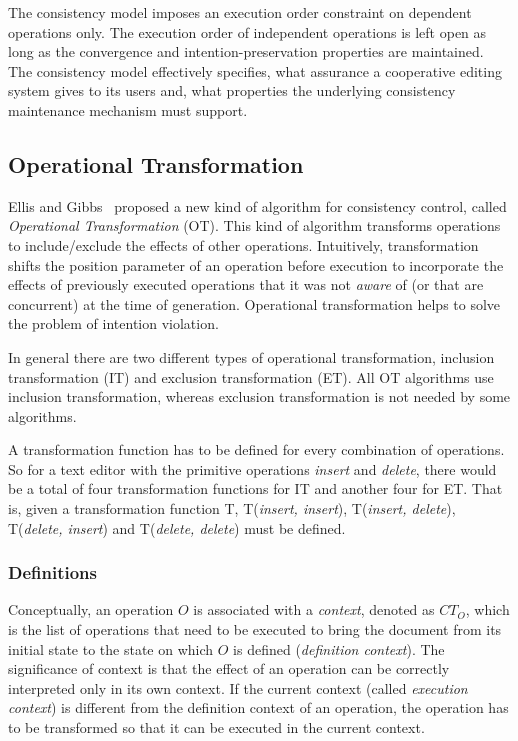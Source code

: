\documentclass[11pt,a4paper]{article}
\begin{document}
The consistency model imposes an execution order constraint on dependent operations only. The execution order of independent operations is left open as long as the convergence and intention-preservation properties are maintained. The consistency model effectively specifies, what assurance a cooperative editing system gives to its users and, what properties the underlying consistency maintenance mechanism must support.



\subsection{Operational Transformation}
{Ellis and Gibbs}~\cite{ellis} proposed a new kind of algorithm for consistency control, called \emph{Operational Transformation} (OT).  This kind of algorithm transforms operations to include/exclude the effects of other operations. Intuitively, transformation shifts the position parameter of an operation before execution to incorporate the effects of previously executed operations that it was not \emph{aware} of (or that are concurrent) at the time of generation. Operational transformation helps to solve the problem of intention violation.

In general there are two different types of operational transformation, inclusion transformation (IT) and exclusion transformation (ET). All OT algorithms use inclusion transformation, whereas exclusion transformation is not needed by some algorithms.

A transformation function has to be defined for every combination of operations. So for a text editor with the primitive operations \emph{insert} and \emph{delete}, there would be a total of four transformation functions for IT and another four for ET. That is, given a transformation function T, T(\emph{insert, insert}), T(\emph{insert, delete}), T(\emph{delete, insert}) and T(\emph{delete, delete}) must be defined.

\subsubsection{Definitions}
\label{definitions}
Conceptually, an operation $O$ is associated with a \emph{context}, denoted as $CT_{O}$, which is the list of operations that need to be executed to bring the document from its initial state to the state on which $O$ is defined (\emph{definition context}). The significance of context is that the effect of an operation can be correctly interpreted only in its own context. If the current context (called \emph{execution context}) is different from the definition context of an operation, the operation has to be transformed so that it can be executed in the current context.
\end{document}
